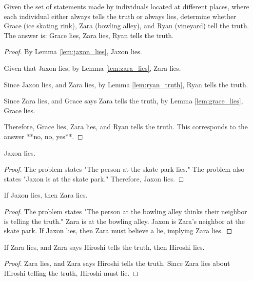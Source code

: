 \begin{tcolorbox}[title=Rewritten Candidate Response, breakable]

\begin{theorem}
Given the set of statements made by individuals located at different places, where each individual either always tells the truth or always lies, determine whether Grace (ice skating rink), Zara (bowling alley), and Ryan (vineyard) tell the truth. The answer is: Grace lies, Zara lies, Ryan tells the truth.
\end{theorem}
\begin{proof}
By Lemma \ref{lem:jaxon_lies}, Jaxon lies.

Given that Jaxon lies, by Lemma \ref{lem:zara_lies}, Zara lies.

Since Jaxon lies, and Zara lies, by Lemma \ref{lem:ryan_truth}, Ryan tells the truth.

Since Zara lies, and Grace says Zara tells the truth, by Lemma \ref{lem:grace_lies}, Grace lies.

Therefore, Grace lies, Zara lies, and Ryan tells the truth. This corresponds to the answer **no, no, yes**.

\end{proof}

\begin{lemma}
\label{lem:jaxon_lies}
Jaxon lies.
\end{lemma}
\begin{proof}
The problem states "The person at the skate park lies."  The problem also states "Jaxon is at the skate park." Therefore, Jaxon lies.
\end{proof}

\begin{lemma}
\label{lem:zara_lies}
If Jaxon lies, then Zara lies.
\end{lemma}
\begin{proof}
The problem states "The person at the bowling alley thinks their neighbor is telling the truth." Zara is at the bowling alley. Jaxon is Zara's neighbor at the skate park. If Jaxon lies, then Zara must believe a lie, implying Zara lies. 
\end{proof}


\begin{lemma}
\label{lem:hiroshi_lies}
If Zara lies, and Zara says Hiroshi tells the truth, then Hiroshi lies.
\end{lemma}
\begin{proof}
Zara lies, and Zara says Hiroshi tells the truth.  Since Zara lies about Hiroshi telling the truth, Hiroshi must lie.
\end{proof}


\end{tcolorbox}
